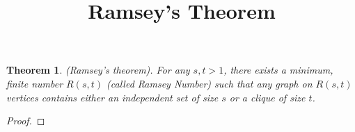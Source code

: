 \documentclass{article}
\title{Ramsey's Theorem}
\newtheorem*{theorem}{Theorem}
\begin{document}
\begin{theorem}
(Ramsey's theorem).
For any $s,t>1$, there exists a minimum, finite number 
$R(s,t)$ (called Ramsey Number) such that any graph
on $R(s,t)$ vertices contains either an independent
set of size $s$ or a clique of size $t$.
\end{theorem}

\begin{proof}

\end{proof}
    
\end{document}

